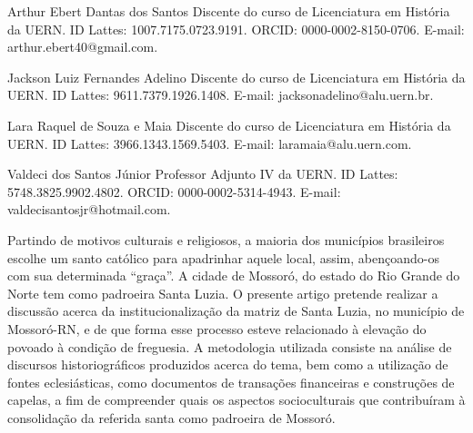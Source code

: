 \begin{refsection}
    \renewcommand{\thefigure}{\arabic{figure}}
    
    \label{chap:institucionalizacao}
    
    \articleAuthor
    {Arthur Ebert Dantas dos Santos}
    {Discente do curso de Licenciatura em História da UERN. ID Lattes: 1007.7175.0723.9191. ORCID: 0000-0002-8150-0706. E-mail: arthur.ebert40@gmail.com.}

    \articleAuthor
    {Jackson Luiz Fernandes Adelino}
    {Discente do curso de Licenciatura em História da UERN. ID Lattes: 9611.7379.1926.1408. E-mail: jacksonadelino@alu.uern.br.}

    \articleAuthor
    {Lara Raquel de Souza e Maia}
    {Discente do curso de Licenciatura em História da UERN. ID Lattes: 3966.1343.1569.5403. E-mail: laramaia@alu.uern.com.}

    \articleAuthor
    {Valdeci dos Santos Júnior}
    {Professor Adjunto IV da UERN. ID Lattes: 5748.3825.9902.4802. ORCID: 0000-0002-5314-4943. E-mail: valdecisantosjr@hotmail.com.}
    
    \begin{galoResumo}
        Partindo de motivos culturais e religiosos, a maioria dos municípios brasileiros escolhe um santo católico para apadrinhar aquele local, assim, abençoando-os com sua determinada ``graça''. A cidade de Mossoró, do estado do Rio Grande do Norte tem como padroeira Santa Luzia. O presente artigo pretende realizar a discussão acerca da institucionalização da matriz de Santa Luzia, no município de Mossoró-RN, e de que forma esse processo esteve relacionado à elevação do povoado à condição de freguesia. A metodologia utilizada consiste na análise de discursos historiográficos produzidos acerca do tema, bem como a utilização de fontes eclesiásticas, como documentos de transações financeiras e construções de capelas, a fim de compreender quais os aspectos socioculturais que contribuíram à consolidação da referida santa como padroeira de Mossoró.
    \end{galoResumo}
    

\end{refsection}
